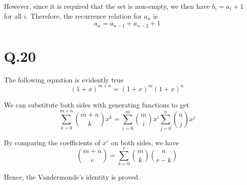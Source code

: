 \documentclass[a4paper,12pt]{article}
\begin{document}
However, since it is required that the set is non-empty, we then have $b_i = a_i + 1$ for all $i$.
Therefore, the recurrence relation for $a_n$ is
\begin{equation*}
	a_n = a_{n-1} + a_{n-2} + 1
\end{equation*}

\section*{Q.20}

The following equation is evidently true
\begin{equation*}
	(1+x)^{m+n} = (1+x)^m (1+x)^n
\end{equation*}

We can substitute both sides with generating functions to get
\begin{equation*}
	\sum_{k=0}^{m+n} \binom{m+n}{k} x^k = \sum_{i=0}^m \binom{m}{i} x^i \sum_{j=0}^n \binom{n}{j} x^j
\end{equation*}

By comparing the coefficients of $x^r$ on both sides, we have
\begin{equation*}
	\binom{m+n}{r} = \sum_{k=0}^r \binom{m}{k} \binom{n}{r-k}
\end{equation*}

Hence, the Vandermonde's identity is proved.
\end{document}
